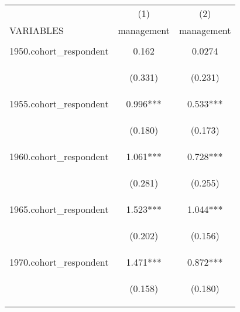\begin{center}
\begin{tabular}{lcc} \hline
 & (1) & (2) \\
VARIABLES & management & management \\ \hline
\vspace{4pt} & \begin{footnotesize}\end{footnotesize} & \begin{footnotesize}\end{footnotesize} \\
1950.cohort\_respondent & 0.162 & 0.0274 \\
\vspace{4pt} & \begin{footnotesize}(0.331)\end{footnotesize} & \begin{footnotesize}(0.231)\end{footnotesize} \\
1955.cohort\_respondent & 0.996*** & 0.533*** \\
\vspace{4pt} & \begin{footnotesize}(0.180)\end{footnotesize} & \begin{footnotesize}(0.173)\end{footnotesize} \\
1960.cohort\_respondent & 1.061*** & 0.728*** \\
\vspace{4pt} & \begin{footnotesize}(0.281)\end{footnotesize} & \begin{footnotesize}(0.255)\end{footnotesize} \\
1965.cohort\_respondent & 1.523*** & 1.044*** \\
\vspace{4pt} & \begin{footnotesize}(0.202)\end{footnotesize} & \begin{footnotesize}(0.156)\end{footnotesize} \\
1970.cohort\_respondent & 1.471*** & 0.872*** \\
\vspace{4pt} & \begin{footnotesize}(0.158)\end{footnotesize} & \begin{footnotesize}(0.180)\end{footnotesize} \\

\end{tabular}
\end{center}
